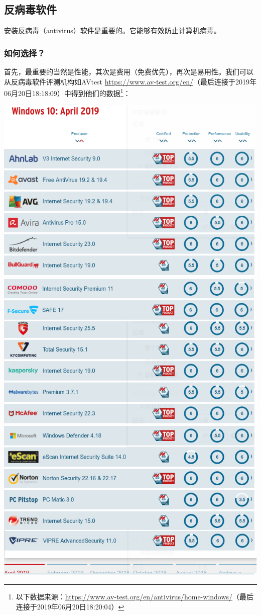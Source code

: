 \documentclass{book}
\begin{document}
\subsection{反病毒软件}
安装反病毒（antivirus）软件是重要的。它能够有效防止计算机病毒。
\subsubsection{如何选择？}
首先，最重要的当然是性能，其次是费用（免费优先），再次是易用性。我们可以从反病毒软件评测机构如AVtest \url{https://www.av-test.org/en/}（最后连接于2019年06月20日18:18:09）中得到他们的数据\footnote{以下数据来源：\url{https://www.av-test.org/en/antivirus/home-windows/}（最后连接于2019年06月20日18:20:04）}：
\begin{center}
\includegraphics[scale=0.5]{pic/avtest1}\includegraphics[scale=0.5]{pic/avtest2}
\includegraphics[scale=0.5]{pic/avtest3}
\end{center}
\end{document}
